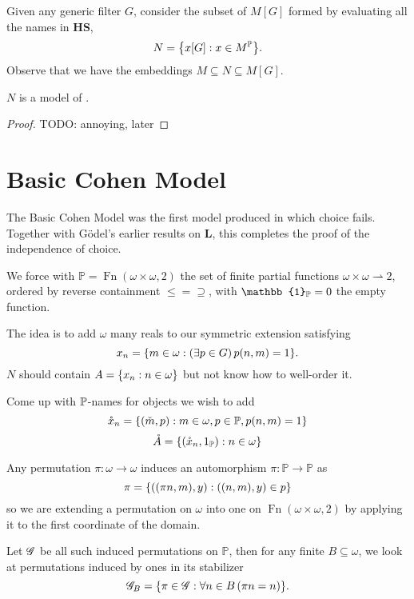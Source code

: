 Given any generic filter \(G\), consider the subset of \(M[G]\) formed by evaluating all the names in \(\mathbf{HS}\),
\[ N = \set{ x[G]: x\in M^{\mathbb{P}} }. \]
Observe that we have the embeddings \(M \subseteq N \subseteq M[G]\).

\begin{theorem}
    \(N\) is a model of \ZF.
\end{theorem}
\begin{proof}
    TODO: annoying, later
\end{proof}

\section{Basic Cohen Model}

The Basic Cohen Model was the first model produced in which choice fails.
Together with Gödel's earlier results on \(\mathbf{L}\), this completes the proof of the independence of choice.

We force with \(\mathbb{P} = \operatorname{Fn}(\omega\times\omega, 2)\)
the set of finite partial functions \(\omega\times\omega \rightharpoonup 2\),
ordered by reverse containment \(\leq = \supseteq\),
with \(\mathbb{1}_\P = 0\) the empty function.

The idea is to add \(\omega\) many reals to our symmetric extension satisfying
\begin{equation} \label{basicCohen:property_x_n}
    x_n = \set{m\in\omega: \left(\exists p\in G\right) p(n,m) = 1}.
\end{equation}
\(N\) should contain \( A = \set{x_n:n\in \omega } \) but not know how to well-order it.

Come up with \(\P\)-names for objects we wish to add
\[ \mathring{x}_n = \set{(\check{m},p): m\in\omega, p\in\P,p(n,m) = 1} \]
\[ \mathring{A} = \set{(\mathring{x}_n,1_\P): n\in\omega} \]


Any permutation \(\pi: \omega \to \omega\) induces an automorphism \(\pi: \mathbb{P}\to\mathbb{P}\) as
\[ \pi = \set{((\pi n, m), y): ((n,m),y) \in p} \]
so we are extending a permutation on \(\omega\) into one on \(\operatorname{Fn}(\omega\times\omega, 2)\)
by applying it to the first coordinate of the domain.

Let \(\G\) be all such induced permutations on \(\mathbb{P}\), then for any finite \(B\subseteq \omega\),
we look at permutations induced by ones in its stabilizer
\[ \G_B = \set{ \pi\in \G: \forall n\in B\left( \pi n = n \right) }. \]

